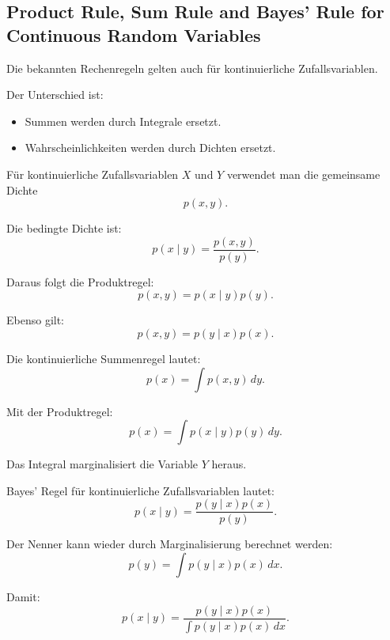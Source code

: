 \documentclass[11pt,a4paper]{scrartcl}
\begin{document}
\subsection{Product Rule, Sum Rule and Bayes' Rule for Continuous Random Variables}

\begin{notebox}
    Die bekannten Rechenregeln gelten auch für kontinuierliche Zufallsvariablen.

    Der Unterschied ist:

    \begin{itemize}
        \item Summen werden durch Integrale ersetzt.
        \item Wahrscheinlichkeiten werden durch Dichten ersetzt.
    \end{itemize}
\end{notebox}

\begin{calculationbox}
    Für kontinuierliche Zufallsvariablen \(X\) und \(Y\) verwendet man die
    gemeinsame Dichte
    \[
        p(x,y).
    \]

    Die bedingte Dichte ist:
    \[
        p(x \mid y)
        =
        \frac{p(x,y)}{p(y)}.
    \]

    Daraus folgt die Produktregel:
    \[
        p(x,y)
        =
        p(x \mid y)p(y).
    \]

    Ebenso gilt:
    \[
        p(x,y)
        =
        p(y \mid x)p(x).
    \]
\end{calculationbox}

\begin{calculationbox}
    Die kontinuierliche Summenregel lautet:
    \[
        p(x)
        =
        \int p(x,y)\,dy.
    \]

    Mit der Produktregel:
    \[
        p(x)
        =
        \int p(x \mid y)p(y)\,dy.
    \]

    Das Integral marginalisiert die Variable \(Y\) heraus.
\end{calculationbox}

\begin{calculationbox}
    Bayes' Regel für kontinuierliche Zufallsvariablen lautet:
    \[
        p(x \mid y)
        =
        \frac{p(y \mid x)p(x)}{p(y)}.
    \]

    Der Nenner kann wieder durch Marginalisierung berechnet werden:
    \[
        p(y)
        =
        \int p(y \mid x)p(x)\,dx.
    \]

    Damit:
    \[
        p(x \mid y)
        =
        \frac{p(y \mid x)p(x)}
        {\int p(y \mid x)p(x)\,dx}.
    \]
\end{calculationbox}
\end{document}
